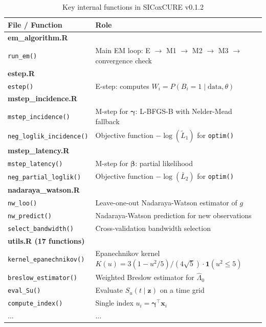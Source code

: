 \documentclass[12pt,a4paper]{article}
\begin{document}
\begin{longtable}{ll}
  \caption{Key internal functions in SICoxCURE v0.1.2}\\
  \toprule
  \textbf{File / Function} & \textbf{Role} \\
  \midrule
  \multicolumn{2}{l}{\textbf{em\_algorithm.R}} \\
  \texttt{run\_em()} &
    Main EM loop: E $\to$ M1 $\to$ M2 $\to$ M3 $\to$
    convergence check \\[3pt]
  \multicolumn{2}{l}{\textbf{estep.R}} \\
  \texttt{estep()} &
    E-step: computes $W_i = P(B_i=1 \mid \text{data}, \theta)$ \\[3pt]
  \multicolumn{2}{l}{\textbf{mstep\_incidence.R}} \\
  \texttt{mstep\_incidence()} &
    M-step for $\boldsymbol{\gamma}$:
    L-BFGS-B with Nelder-Mead fallback \\
  \texttt{neg\_loglik\_incidence()} &
    Objective function $-\log(\tilde{L}_1)$ for \texttt{optim()} \\[3pt]
  \multicolumn{2}{l}{\textbf{mstep\_latency.R}} \\
  \texttt{mstep\_latency()} &
    M-step for $\boldsymbol{\beta}$: partial likelihood \\
  \texttt{neg\_partial\_loglik()} &
    Objective function $-\log(\bar{L}_2)$ for \texttt{optim()} \\[3pt]
  \multicolumn{2}{l}{\textbf{nadaraya\_watson.R}} \\
  \texttt{nw\_loo()} &
    Leave-one-out Nadaraya-Watson estimator of $g$ \\
  \texttt{nw\_predict()} &
    Nadaraya-Watson prediction for new observations \\
  \texttt{select\_bandwidth()} &
    Cross-validation bandwidth selection \\[3pt]
  \multicolumn{2}{l}{\textbf{utils.R (17 functions)}} \\
  \texttt{kernel\_epanechnikov()} &
    Epanechnikov kernel
    $K(u) = 3(1-u^2/5)/(4\sqrt{5}) \cdot \mathbf{1}(u^2 \leq 5)$ \\
  \texttt{breslow\_estimator()} &
    Weighted Breslow estimator for $\hat{\Lambda}_0$ \\
  \texttt{eval\_Su()} &
    Evaluate $S_u(t \mid \mathbf{z})$ on a time grid \\
  \texttt{compute\_index()} &
    Single index $u_i = \boldsymbol{\gamma}^\top \mathbf{x}_i$ \\
  $\ldots$ & $\ldots$ \\
  \bottomrule
\end{longtable}
\end{document}
